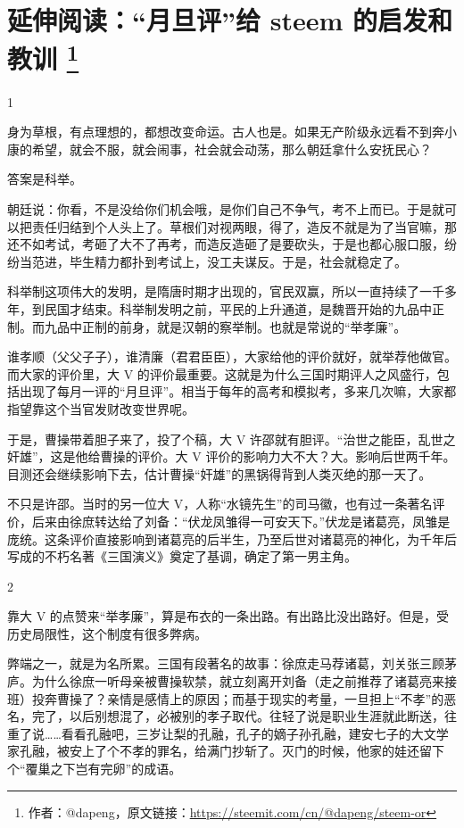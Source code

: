\documentclass[]{ctexbook}
\begin{document}
\hypertarget{cn-reader-lesson}{%
\section[延伸阅读：``月旦评''给 steem 的启发和教训 ]{\texorpdfstring{延伸阅读：``月旦评''给 steem 的启发和教训 \footnote{作者：@dapeng，原文链接：\url{https://steemit.com/cn/@dapeng/steem-or}}}{延伸阅读：``月旦评''给 steem 的启发和教训 }}\label{cn-reader-lesson}}

1

身为草根，有点理想的，都想改变命运。古人也是。如果无产阶级永远看不到奔小康的希望，就会不服，就会闹事，社会就会动荡，那么朝廷拿什么安抚民心？

答案是科举。

朝廷说：你看，不是没给你们机会哦，是你们自己不争气，考不上而已。于是就可以把责任归结到个人头上了。草根们对视两眼，得了，造反不就是为了当官嘛，那还不如考试，考砸了大不了再考，而造反造砸了是要砍头，于是也都心服口服，纷纷当范进，毕生精力都扑到考试上，没工夫谋反。于是，社会就稳定了。

科举制这项伟大的发明，是隋唐时期才出现的，官民双赢，所以一直持续了一千多年，到民国才结束。科举制发明之前，平民的上升通道，是魏晋开始的九品中正制。而九品中正制的前身，就是汉朝的察举制。也就是常说的``举孝廉''。

谁孝顺（父父子子），谁清廉（君君臣臣），大家给他的评价就好，就举荐他做官。而大家的评价里，大 V 的评价最重要。这就是为什么三国时期评人之风盛行，包括出现了每月一评的``月旦评''。相当于每年的高考和模拟考，多来几次嘛，大家都指望靠这个当官发财改变世界呢。

于是，曹操带着胆子来了，投了个稿，大 V 许邵就有胆评。``治世之能臣，乱世之奸雄''，这是他给曹操的评价。大 V 评价的影响力大不大？大。影响后世两千年。目测还会继续影响下去，估计曹操``奸雄''的黑锅得背到人类灭绝的那一天了。

不只是许邵。当时的另一位大 V，人称``水镜先生''的司马徽，也有过一条著名评价，后来由徐庶转达给了刘备：``伏龙凤雏得一可安天下。''伏龙是诸葛亮，凤雏是庞统。这条评价直接影响到诸葛亮的后半生，乃至后世对诸葛亮的神化，为千年后写成的不朽名著《三国演义》奠定了基调，确定了第一男主角。

2

靠大 V 的点赞来``举孝廉''，算是布衣的一条出路。有出路比没出路好。但是，受历史局限性，这个制度有很多弊病。

弊端之一，就是为名所累。三国有段著名的故事：徐庶走马荐诸葛，刘关张三顾茅庐。为什么徐庶一听母亲被曹操软禁，就立刻离开刘备（走之前推荐了诸葛亮来接班）投奔曹操了？亲情是感情上的原因；而基于现实的考量，一旦担上``不孝''的恶名，完了，以后别想混了，必被别的孝子取代。往轻了说是职业生涯就此断送，往重了说\ldots{}\ldots{}看看孔融吧，三岁让梨的孔融，孔子的嫡子孙孔融，建安七子的大文学家孔融，被安上了个不孝的罪名，给满门抄斩了。灭门的时候，他家的娃还留下个``覆巢之下岂有完卵''的成语。
\end{document}
